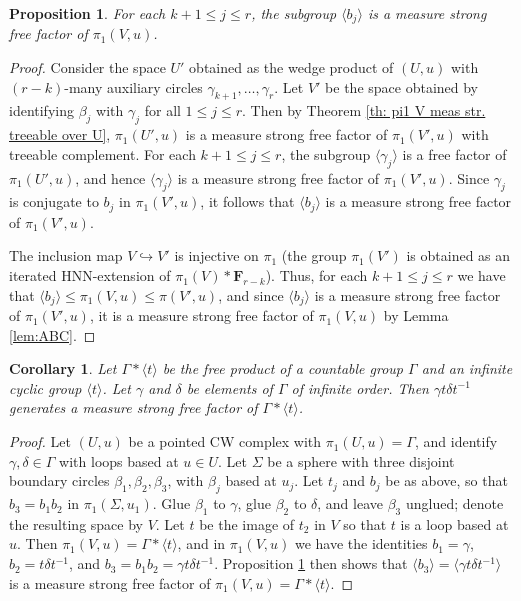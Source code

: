 \documentclass[11pt]{amsart}
\theoremstyle{definition}
\theoremstyle{plain}
\newtheorem{proposition}[definition]{Proposition}
\newtheorem{corollary}[definition]{Corollary}
\newcommand{\<}{\langle}
\renewcommand{\>}{\rangle}
\newcommand{\FF}{\mathbf{F}}
\begin{document}
\begin{proposition}\label{prop:msff} For each $k+1\leq j\leq r$, the subgroup $\langle b_j\rangle$ is a measure strong free factor of $\pi _1(V,u)$.
\end{proposition}

\begin{proof} Consider the space $U'$ obtained as the wedge product of $(U,u)$ with $(r-k)$-many auxiliary circles $\gamma_{k+1},\dots, \gamma _r$. Let $V'$ be the space obtained by identifying $\beta _j$ with $\gamma _j$ for all $1\leq j\leq r$. Then by Theorem \ref{th: pi1 V meas str. treeable over U}, $\pi _1(U',u)$ is a measure strong free factor of $\pi _1 (V',u )$ with treeable complement. For each $k+1\leq j\leq r$, the subgroup $\langle \gamma _j \rangle$ is a free factor of $\pi _1(U',u)$, and hence $\langle \gamma _j\rangle$ is a measure strong free factor of $\pi _1 (V',u)$. Since $\gamma _j$ is conjugate to $b_j$ in $\pi _1 (V',u)$, it follows that $\langle b_j\rangle$ is a measure strong free factor of $\pi _1 (V',u)$.

The inclusion map $V\hookrightarrow V'$ is injective on $\pi _1$ (the group $\pi _1 (V')$ is obtained as an iterated HNN-extension of $\pi _1(V)\ast \FF _{r-k}$). Thus, for each $k+1\leq j \leq r$ we have that $\langle b_j\rangle \leq \pi _1(V,u)\leq \pi (V',u)$, and since $\langle b_j\rangle$ is a measure strong free factor of $\pi _1 (V',u)$, it is a measure strong free factor of $\pi _1(V,u)$ by Lemma \ref{lem:ABC}.
\end{proof}

\begin{corollary}\label{cor:gtht^{-1}}
Let $\Gamma \ast \langle t \rangle$ be the free product of a countable group $\Gamma$ and an infinite cyclic group $\langle t\rangle$. Let $\gamma$ and $\delta$ be elements of $\Gamma$ of infinite order. Then $\gamma t\delta t^{-1}$ generates a measure strong free factor of $\Gamma \ast\langle t\rangle$.
\end{corollary}

\begin{proof}
Let $(U,u)$ be a pointed CW complex with $\pi _1(U,u)=\Gamma$, and identify $\gamma ,\delta \in \Gamma$ with loops based at $u\in U$. Let $\Sigma$ be a sphere with three disjoint boundary circles $\beta _1,\beta _2,\beta _3$, with $\beta _j$ based at $u_j$. Let $t_j$ and $b_j$ be as above, so that $b_3=b_1b_2$ in $\pi _1(\Sigma ,u_1)$. Glue $\beta _1$ to $\gamma$, glue $\beta _2$ to $\delta$, and leave $\beta _3$ unglued; denote the resulting space by $V$. Let $t$ be the image of $t_2$ in $V$ so that $t$ is a loop based at $u$. Then $\pi _1 (V,u)=\Gamma \ast \langle t\rangle$, and in $\pi _1(V,u)$ we have the identities $b_1=\gamma$, $b_2=t\delta t^{-1}$, and $b_3=b_1b_2=\gamma t\delta t^{-1}$. Proposition \ref{prop:msff} then shows that $\langle b_3\rangle =\langle \gamma t\delta t^{-1}\rangle$ is a measure strong free factor of $\pi _1(V,u)=\Gamma \ast \langle t\rangle$.
\end{proof}
\end{document}
